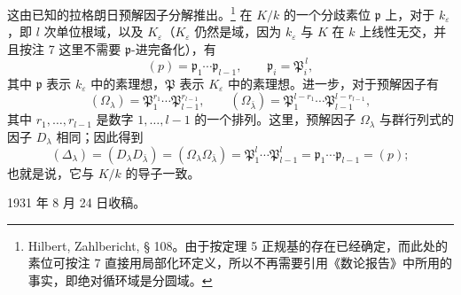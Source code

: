 \documentclass[11pt]{article}
\newcommand{\frakp}{\mathfrak p}
\newcommand{\frakP}{\mathfrak P}
\begin{document}
这由已知的拉格朗日预解因子分解推出。\footnote{Hilbert, Zahlbericht, § 108。由于按定理 5 正规基的存在已经确定，而此处的素位可按注 7 直接用局部化环定义，所以不再需要引用《数论报告》中所用的事实，即绝对循环域是分圆域。} 在 \(K/k\) 的一个分歧素位 \(\frakp\) 上，对于 \(k_\varepsilon\)，即 \(l\) 次单位根域，以及 \(K_\varepsilon\)（\(K_\varepsilon\) 仍然是域，因为 \(k_\varepsilon\) 与 \(K\) 在 \(k\) 上线性无交，并且按注 7 这里不需要 \(\frakp\)-进完备化），有
\[
        (p)=\frakp_1\cdots\frakp_{l-1},
        \qquad
        \frakp_i=\frakP_i^{\,l},
\]
其中 \(\frakp\) 表示 \(k_\varepsilon\) 中的素理想，\(\frakP\) 表示 \(K_\varepsilon\) 中的素理想。进一步，对于预解因子有
\[
        (\Omega_\lambda)=\frakP_1^{r_1}\cdots\frakP_{l-1}^{r_{l-1}},
        \qquad
        (\Omega_{\bar\lambda})=
        \frakP_1^{l-r_1}\cdots\frakP_{l-1}^{l-r_{l-1}},
\]
其中 \(r_1,\ldots,r_{l-1}\) 是数字 \(1,\ldots,l-1\) 的一个排列。这里，预解因子 \(\Omega_\lambda\) 与群行列式的因子 \(D_\lambda\) 相同；因此得到
\[
        (\Delta_\lambda)=(D_\lambda D_{\bar\lambda})
        =(\Omega_\lambda\Omega_{\bar\lambda})
        =\frakP_1^{l}\cdots\frakP_{l-1}^{l}
        =\frakp_1\cdots\frakp_{l-1}=(p);
\]
也就是说，它与 \(K/k\) 的导子一致。

\begin{center}
1931 年 8 月 24 日收稿。
\end{center}
\end{document}
